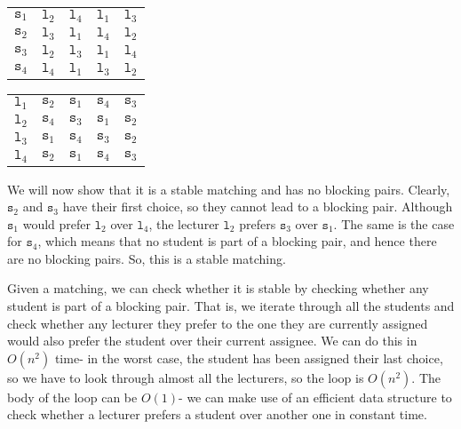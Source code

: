 \documentclass[a4paper, openany]{memoir}
\begin{document}
    \begin{table}[H]
        \centering
        \begin{subtable}{0.45\textwidth}
            \centering
            \begin{tabular}{c|cccc}
                $\texttt{s}_1$ & $\texttt{l}_2$ & \underline{$\texttt{l}_4$} & $\texttt{l}_1$ & $\texttt{l}_3$ \\
                $\texttt{s}_2$ & \underline{$\texttt{l}_3$} & $\texttt{l}_1$ & $\texttt{l}_4$ & $\texttt{l}_2$ \\
                $\texttt{s}_3$ & \underline{$\texttt{l}_2$} & $\texttt{l}_3$ & $\texttt{l}_1$ & $\texttt{l}_4$ \\
                $\texttt{s}_4$ & $\texttt{l}_4$ & \underline{$\texttt{l}_1$} & $\texttt{l}_3$ & $\texttt{l}_2$
            \end{tabular}
        \end{subtable}
        \hfill
        \begin{subtable}{0.45\textwidth}
            \centering
            \begin{tabular}{c|cccc}
                $\texttt{l}_1$ & $\texttt{s}_2$ & $\texttt{s}_1$ & \underline{$\texttt{s}_4$} & $\texttt{s}_3$ \\
                $\texttt{l}_2$ & $\texttt{s}_4$ & \underline{$\texttt{s}_3$} & $\texttt{s}_1$ & $\texttt{s}_2$ \\
                $\texttt{l}_3$ & $\texttt{s}_1$ & $\texttt{s}_4$ & $\texttt{s}_3$ & \underline{$\texttt{s}_2$} \\
                $\texttt{l}_4$ & $\texttt{s}_2$ & \underline{$\texttt{s}_1$} & $\texttt{s}_4$ & $\texttt{s}_3$
            \end{tabular}
        \end{subtable}
    \end{table}
    \noindent We will now show that it is a stable matching and has no blocking pairs. Clearly, $\texttt{s}_2$ and $\texttt{s}_3$ have their first choice, so they cannot lead to a blocking pair. Although $\texttt{s}_1$ would prefer $\texttt{l}_2$ over $\texttt{l}_4$, the lecturer $\texttt{l}_2$ prefers $\texttt{s}_3$ over $\texttt{s}_1$. The same is the case for $\texttt{s}_4$, which means that no student is part of a blocking pair, and hence there are no blocking pairs. So, this is a stable matching.

    Given a matching, we can check whether it is stable by checking whether any student is part of a blocking pair. That is, we iterate through all the students and check whether any lecturer they prefer to the one they are currently assigned would also prefer the student over their current assignee. We can do this in $O(n^2)$ time- in the worst case, the student has been assigned their last choice, so we have to look through almost all the lecturers, so the loop is $O(n^2)$. The body of the loop can be $O(1)$- we can make use of an efficient data structure to check whether a lecturer prefers a student over another one in constant time.
\end{document}

